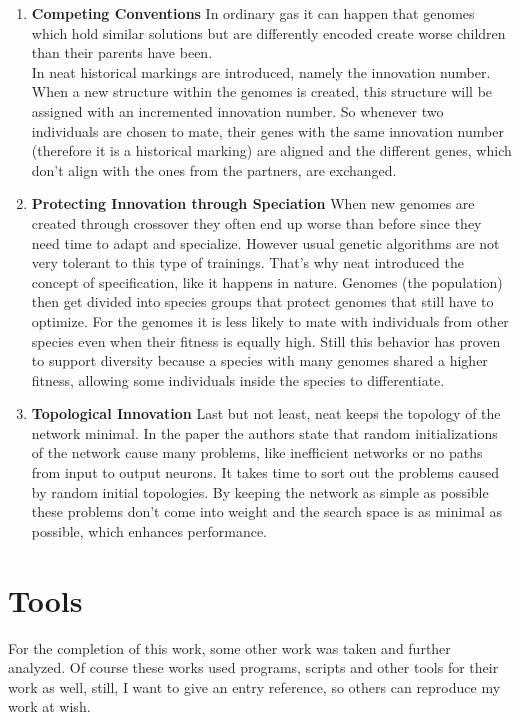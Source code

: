 	\begin{enumerate}
		\item \textbf{Competing Conventions}
			In ordinary \gls{ga}s it can happen that genomes which hold similar solutions but are differently encoded create worse children than their parents have been. \\
			In \gls{neat} historical markings are introduced, namely the innovation number. When a new structure within the genomes is created, this structure will be assigned with an incremented innovation number. So whenever two individuals are chosen to mate, their genes with the same innovation number (therefore it is a historical marking) are aligned and the different genes, which don't align with the ones from the partners, are exchanged.
		\item \textbf{Protecting Innovation through Speciation}
			When new genomes are created through crossover they often end up worse than before since they need time to adapt and specialize. However usual genetic algorithms are not very tolerant to this type of trainings. That's why \gls{neat} introduced the concept of specification, like it happens in nature. Genomes (the population) then get divided into species groups that protect genomes that still have to optimize. For the genomes it is less likely to mate with individuals from other species even when their fitness is equally high. Still this behavior has proven to support diversity because a species with many genomes shared a higher fitness, allowing some individuals inside the species to differentiate.
		\item \textbf{Topological Innovation}
			Last but not least, \gls{neat} keeps the topology of the network minimal. In the paper \cite{stanley_evolving_2002} the authors state that random initializations of the network cause many problems, like inefficient networks or no paths from input to output neurons. It takes time to sort out the problems caused by random initial topologies. By keeping the network as simple as possible these problems don't come into weight and the search space is as minimal as possible, which enhances performance.
	\end{enumerate}

\section{Tools}
\label{sec:related:tools}
For the completion of this work, some other work was taken and further analyzed. Of course these works used programs, scripts and other tools for their work as well, still, I want to give an entry reference, so others can reproduce my work at wish.
